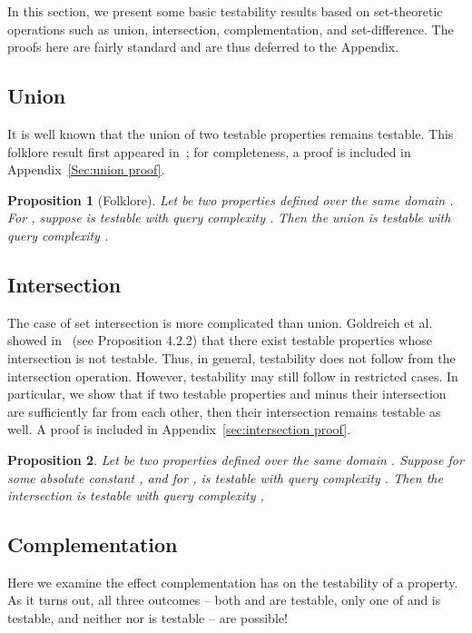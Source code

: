\documentclass[11pt,english]{article}
\newtheorem{prop}{Proposition}
\theoremstyle{definition}
\theoremstyle{remark}
\begin{document}
In this section, we present some basic testability results based on
set-theoretic operations such as union, intersection, complementation,
and set-difference. The proofs here are fairly standard and are 
thus deferred to the Appendix.


\subsection{Union}
\label{Sec:union} 
It is well known that the union of two testable properties remains testable. 
This folklore result first appeared in~\cite{GGR98};
for completeness, a proof is included in Appendix~\ref{Sec:union proof}.

\begin{prop}[Folklore]\label{prop:OR} 
Let  
be two properties defined over the same domain . 
For , suppose
 is testable with query complexity . 
Then the union  is testable with query complexity .
\end{prop}




\subsection{Intersection}

\label{Sec:intersection} 
The case of set intersection is more complicated than union. 
Goldreich et al. showed in~\cite{GGR98} (see Proposition 4.2.2) 
that there exist testable properties whose intersection is not testable. 
Thus, in general, testability does not follow from the intersection operation. 
However, testability may still follow in restricted cases. 
In particular, we show that if two testable properties 
and  minus their intersection are sufficiently far from each
other, then their intersection remains testable as well. 
A proof is included in Appendix~\ref{sec:intersection proof}.

\begin{prop}\label{prop:AND} 
Let 
be two properties defined over the same domain . 
Suppose 
for some absolute constant , and for , 
is testable with query complexity .
Then the intersection  
is testable with query complexity , 
\end{prop} 

\subsection{Complementation}

\label{Sec:complement} Here we examine the effect complementation
has on the testability of a property. 
As it turns out, all three outcomes -- both  and  are testable, only one of
 and  is testable, and neither 
nor  is testable -- are possible! 
\end{document}
